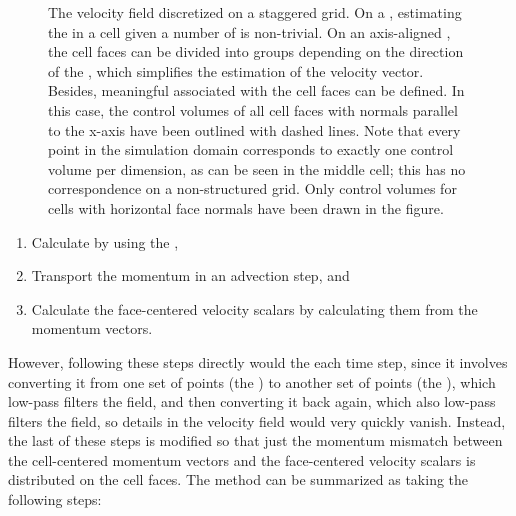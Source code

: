\begin{figure}
{
    }
    \caption{The velocity field discretized on a staggered grid.  On a , estimating the  in a cell given a number of   is non-trivial.  On an axis-aligned , the cell faces can be divided into groups depending on the direction of the , which simplifies the estimation of the velocity vector. Besides, meaningful  associated with the cell faces can be defined. In this case, the control volumes of all cell faces with normals parallel to the x-axis have been outlined with dashed lines. Note that every point in the simulation domain corresponds to exactly one control volume per dimension, as can be seen in the middle cell; this has no correspondence on a non-structured grid. Only control volumes for cells with horizontal face normals have been drawn in the figure.}
    \label{fig:velocity_advection}
\end{figure}

\begin{enumerate}
    \item Calculate   by using the  ,
    \item Transport the momentum in an advection step, and
    \item Calculate the face-centered velocity scalars by calculating them from the momentum vectors.
\end{enumerate}

However, following these steps directly would  the  each time step, since it involves converting it from one set of points (the ) to another set of points (the ), which low-pass filters the field, and then converting it back again, which also low-pass filters the field, so details in the velocity field would very quickly vanish. Instead, the last of these steps is modified so that just the momentum mismatch between the cell-centered momentum vectors and the face-centered velocity scalars is distributed on the cell faces. The method can be summarized as taking the following steps:

